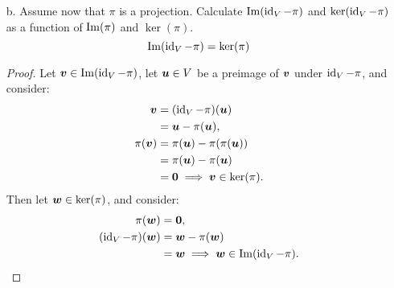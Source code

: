 \documentclass[11pt]{article}
\begin{document}
\begin{enumerate}
\begin{enumerate}
              \item[b.] Assume now that $\pi$ is a projection.  Calculate $\operatorname{Im}(\operatorname{id}_V - \pi)$ and $\ker(\operatorname{id}_V
                        - \pi)$ as a function of $\operatorname{Im}(\pi)$ and $\ker(\pi)$.
                    \[
                        \operatorname{Im}(\operatorname{id}_V - \pi) = \ker(\pi)
                    \]
                    \begin{proof}
                        Let $\boldsymbol{v} \in \operatorname{Im}(\operatorname{id}_V - \pi)$, let $\boldsymbol{u} \in V$ be a preimage of $\boldsymbol{v}$ under
                        $\operatorname{id}_V - \pi$, and consider:
                        \[
                            \begin{aligned}
                                \boldsymbol{v}      & = (\operatorname{id}_V - \pi)(\boldsymbol{u})                   \\
                                              & = \boldsymbol{u} - \pi(\boldsymbol{u}),                 \\
                                \pi(\boldsymbol{v}) & = \pi(\boldsymbol{u}) - \pi(\pi(\boldsymbol{u}))        \\
                                              & = \pi(\boldsymbol{u}) - \pi(\boldsymbol{u})             \\
                                              & = \boldsymbol{0} \implies \boldsymbol{v} \in \ker(\pi).
                            \end{aligned}
                        \]
                        Then let $\boldsymbol{w} \in \ker(\pi)$, and consider:
                        \[
                            \begin{aligned}
                                \pi(\boldsymbol{w})           & = \boldsymbol{0},                                         \\
                                (\operatorname{id}_V - \pi)(\boldsymbol{w}) & = \boldsymbol{w} - \pi(\boldsymbol{w})                          \\
                                                        & = \boldsymbol{w} \implies \boldsymbol{w} \in \operatorname{Im}(\operatorname{id}_V - \pi).
                            \end{aligned}
                        \]
                    \end{proof}


\end{enumerate}
\end{enumerate}
\end{document}
